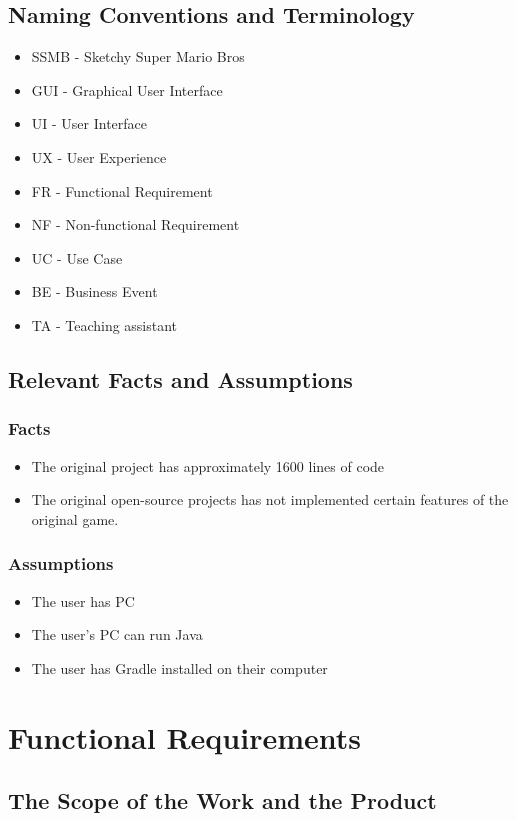 \documentclass[12pt, titlepage]{article}
\begin{document}
\subsection{Naming Conventions and Terminology}
	\begin{itemize}
		\item SSMB - Sketchy Super Mario Bros
		\item GUI - Graphical User Interface
		\item UI - User Interface
		\item UX - User Experience
		\item FR - Functional Requirement
		\item NF - Non-functional Requirement
		\item UC - Use Case
		\item BE - Business Event
		\item TA - Teaching assistant
	\end{itemize}
\subsection{Relevant Facts and Assumptions}
\subsubsection{Facts}
	\begin{itemize}
		\item The original project has approximately 1600 lines of code
		\item The original open-source projects has not implemented certain features of the original game.
	\end{itemize}

\subsubsection{Assumptions}
\begin{itemize}
		\item The user has PC
		\item The user's PC can run Java
		\item The user has Gradle installed on their computer
	\end{itemize}

\section{Functional Requirements}

\subsection{The Scope of the Work and the Product}
\end{document}

